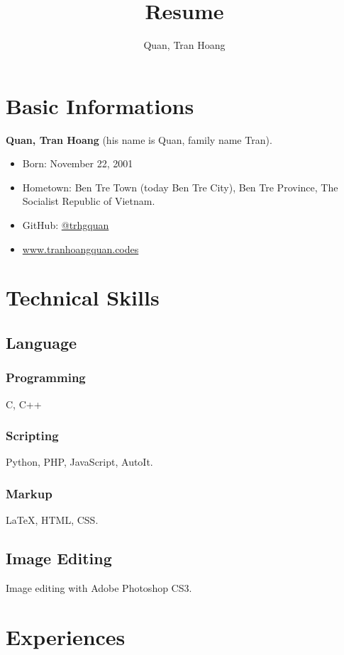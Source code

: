 \documentclass{article}
\renewcommand{\maketitle}{
    \begin{center}
        {\huge\bfseries\theauthor}
    \end{center}
}
\begin{document}
    \title{Resume}
    \author{Quan, Tran Hoang}
    \maketitle

    \section{Basic Informations}
        {\bfseries Quan, Tran Hoang} (his name is Quan, family name Tran).
        \begin{itemize}
            \item Born: November 22, 2001
            \item Hometown: Ben Tre Town (today Ben Tre City), Ben Tre Province, The Socialist Republic of Vietnam.
            \item GitHub: \href{https://github.com/trhgquan}{@trhgquan}
            \item \href{https://www.tranhoangquan.codes}{www.tranhoangquan.codes}
        \end{itemize}

    \section{Technical Skills}
        \subsection{Language}
            \subsubsection{Programming}
                C, C++
            \subsubsection{Scripting}
                Python, PHP, JavaScript, AutoIt.
            \subsubsection{Markup}
                \LaTeX, HTML, CSS.

        \subsection{Image Editing}
            Image editing with Adobe Photoshop CS3.

    \section{Experiences}
\end{document}
